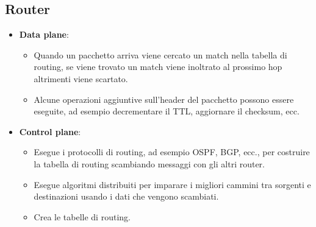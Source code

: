 \subsection{Router}
\begin{itemize}
	\item \textbf{Data plane}:
	\begin{itemize}
		\item Quando un pacchetto arriva viene cercato un match nella tabella di routing, se viene trovato un match viene inoltrato al prossimo hop altrimenti viene scartato.
		\item Alcune operazioni aggiuntive sull'header del pacchetto possono essere eseguite, ad esempio decrementare il TTL, aggiornare il checksum, ecc.
	\end{itemize}
	\item \textbf{Control plane}:
	\begin{itemize}
		\item Esegue i protocolli di routing, ad esempio OSPF, BGP, ecc., per costruire la tabella di routing scambiando messaggi con gli altri router.
		\item Esegue algoritmi distribuiti per imparare i migliori cammini tra sorgenti e destinazioni usando i dati che vengono scambiati.
		\item Crea le tabelle di routing.
	\end{itemize}
\end{itemize}

